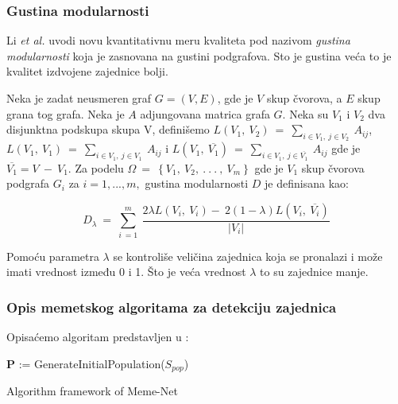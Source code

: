 \documentclass[a4paper]{article}
\begin{document}
\subsubsection{Gustina modularnosti}

Li \textit{et al.} \cite{li} uvodi novu kvantitativnu meru kvaliteta pod nazivom \textit{gustina modularnosti} koja je zasnovana na gustini podgrafova. Sto je gustina veća to je kvalitet izdvojene zajednice bolji.

Neka je zadat neusmeren graf $G = (V, E)$, gde je $V$ skup čvorova, a $E$ skup grana tog grafa.
Neka je $A$ adjungovana matrica grafa $G$. Neka su $V_1$ i $V_2$ dva disjunktna podskupa skupa V, definišemo $L\left(V_1,\:V_2\right)\:=\:\sum _{i\in V_1,\:j\in V_2}\:A_{ij}$, 
$L\left(V_1,\:V_1\right)\:=\:\sum _{i\in V_1,\:j\in V_1}\:A_{ij}$ i
$L\left(V_1,\:\overline{V_1}\right)\:=\:\sum _{i\in V_1,\:j\in \overline{V_1}}\:A_{ij}$ gde je  $\overline{V_1}=V\:-\:V_1$. Za podelu $\Omega \:=\:\left\{V_1,\:V_2,\:.\:.\:.\:,\:V_m\right\}$ gde je $V_1$
skup čvorova podgrafa $G_i$ za $i=1, . . ., m,$ gustina modularnosti $D$ je definisana kao:

\begin{equation}
D_\lambda\:=\:\sum _{i\:=1}^m\:\frac{2\lambda L\left(V_i,\:V_i\right)-\:2\left(1-\lambda\right)L\left(V_i,\:\overline{V_i}\right)}{\left|V_i\right|}
\end{equation}

Pomoću parametra $\lambda$ se kontroliše veličina zajednica koja se pronalazi i može imati vrednost između 0 i 1. Što je veća vrednost $\lambda$ to su zajednice manje.

\subsubsection{Opis memetskog algoritama za detekciju zajednica}

Opisaćemo algoritam predstavljen u \cite{gong}:

\begin{algorithm}[H]
\SetAlgoLined
{}
\textbf{P} := GenerateInitialPopulation($S_{pop}$)
\;
 \caption{Algorithm framework of Meme-Net}
\end{algorithm}
\end{document}
